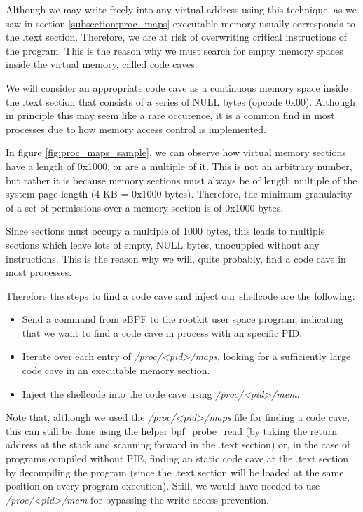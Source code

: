 Although we may write freely into any virtual address using this technique, as we saw in section \ref{subsection:proc_maps} executable memory usually corresponds to the .text section. Therefore, we are at risk of overwriting critical instructions of the program. This is the reason why we must search for empty memory spaces inside the virtual memory, called code caves.

We will consider an appropriate code cave as a continuous memory space inside the .text section that consists of a series of NULL bytes (opcode 0x00). Although in principle this may seem like a rare occurence, it is a common find in most processes due to how memory access control is implemented.

In figure \ref{fig:proc_maps_sample}, we can observe how virtual memory sections have a length of 0x1000, or are a multiple of it. This is not an arbitrary number, but rather it is because memory sections must always be of length multiple of the system page length (4 KB = 0x1000 bytes). Therefore, the minimum granularity of a set of permissions over a memory section is of 0x1000 bytes.

Since sections must occupy a multiple of 1000 bytes, this leads to multiple sections which leave lots of empty, NULL bytes, unocuppied without any instructions. This is the reason why we will, quite probably, find a code cave in most processes.

Therefore the steps to find a code cave and inject our shellcode are the following:
\begin{itemize}
\item Send a command from eBPF to the rootkit user space program, indicating that we want to find a code cave in process with an specific PID.
\item Iterate over each entry of \textit{/proc/<pid>/maps}, looking for a sufficiently large code cave in an executable memory section.
\item Inject the shellcode into the code cave using \textit{/proc/<pid>/mem}.
\end{itemize}

Note that, although we used the \textit{/proc/<pid>/maps} file for finding a code cave, this can still be done using the helper bpf\_probe\_read (by taking the return address at the stack and scanning forward in the .text section) or, in the case of programs compiled without PIE, finding an static code cave at the .text section by decompiling the program (since the .text section will be loaded at the same position on every program execution). Still, we would have needed to use \textit{/proc/<pid>/mem} for bypassing the write access prevention.

